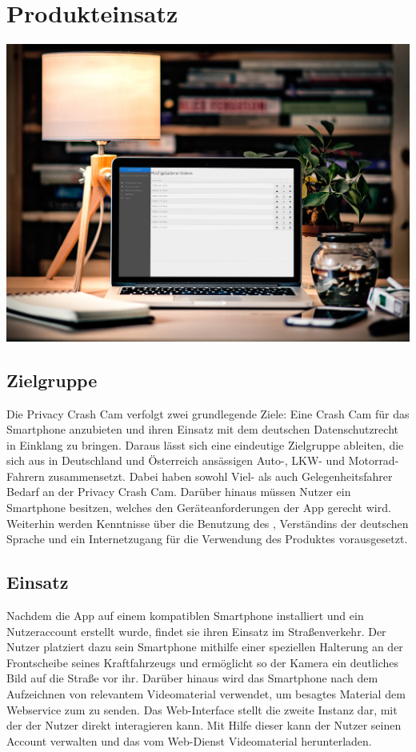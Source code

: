 \chapter{Produkteinsatz}

\includegraphics[width=\textwidth]{subtopicsFuncspec/Res/Mockups/Webinterface_desktop.jpg}

\section{Zielgruppe}
Die Privacy Crash Cam verfolgt zwei grundlegende Ziele: Eine Crash Cam für das \gls{Smartphone} anzubieten und ihren Einsatz mit dem deutschen Datenschutzrecht in Einklang zu bringen. Daraus lässt sich eine eindeutige Zielgruppe ableiten, die sich aus in Deutschland und Österreich ansässigen Auto-, LKW- und Motorrad-Fahrern zusammensetzt. Dabei haben sowohl Viel- als auch Gelegenheitsfahrer Bedarf an der Privacy Crash Cam. Darüber hinaus müssen Nutzer ein \gls{Smartphone} besitzen, welches den Geräteanforderungen der \gls{App} gerecht wird. Weiterhin werden Kenntnisse über die Benutzung des , Verständins der deutschen Sprache und ein Internetzugang für die Verwendung des Produktes vorausgesetzt.

\section{Einsatz}
Nachdem die \gls{App} auf einem kompatiblen \gls{Smartphone} installiert und ein Nutzeraccount erstellt wurde, findet sie ihren Einsatz im Straßenverkehr. Der Nutzer platziert dazu sein \gls{Smartphone} mithilfe einer speziellen Halterung an der Frontscheibe seines Kraftfahrzeugs und ermöglicht so der Kamera ein deutliches Bild auf die Straße vor ihr. Darüber hinaus wird das \gls{Smartphone} nach dem Aufzeichnen von relevantem Videomaterial verwendet, um besagtes Material dem Webservice zum  zu senden.\newline
Das Web-Interface stellt die zweite Instanz dar, mit der der Nutzer direkt interagieren kann. Mit Hilfe dieser kann der Nutzer seinen Account verwalten und das vom \gls{Web-Dienst}  Videomaterial herunterladen.

